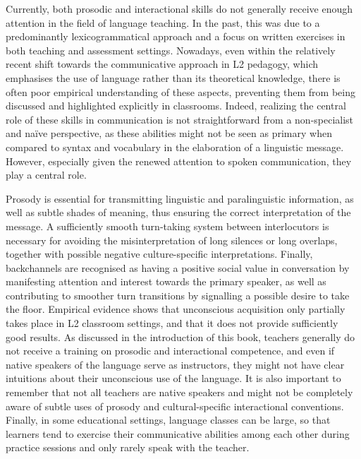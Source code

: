 \begin{stylecaption}
\textup{Currently, both prosodic and interactional skills do not generally receive enough attention in the field of language teaching. In the past, this was due to a predominantly lexicogrammatical approach and a focus on written exercises in both teaching and assessment settings. Nowadays, even within the relatively recent shift towards the communicative approach in L2 pedagogy, which emphasises the use of language rather than its theoretical knowledge, there is often poor empirical understanding of these aspects, preventing them from being discussed and highlighted explicitly in classrooms. Indeed, realizing the central role of these skills in communication is not straightforward from a non-specialist and naïve perspective, as these abilities might not be seen as primary when compared to syntax and vocabulary in the elaboration of a linguistic message. However, especially given the renewed attention to spoken communication, they play a central role.} 
\end{stylecaption}

\begin{stylecaption}
\textup{Prosody is essential for transmitting linguistic and paralinguistic information, as well as subtle shades of meaning, thus ensuring the correct interpretation of the message. A sufficiently smooth turn-taking system between interlocutors is necessary for avoiding the misinterpretation of long silences or long overlaps, together with possible negative culture-specific interpretations. Finally, backchannels are recognised as having a positive social value in conversation by manifesting attention and interest towards the primary speaker, as well as contributing to smoother turn transitions by signalling a possible desire to take the floor. Empirical evidence shows that unconscious acquisition only partially takes place in L2 classroom settings, and that it does not provide sufficiently good results. As discussed in the introduction of this book, teachers generally do not receive a training on prosodic and interactional competence, and even if native speakers of the language serve as instructors, they might not have clear intuitions about their unconscious use of the language. It is also important to remember that not all teachers are native speakers and might not be completely aware of subtle uses of prosody and cultural-specific interactional conventions. Finally, in some educational settings, language classes can be large, so that learners tend to exercise their communicative abilities among each other during practice sessions and only rarely speak with the teacher.} 
\end{stylecaption}

